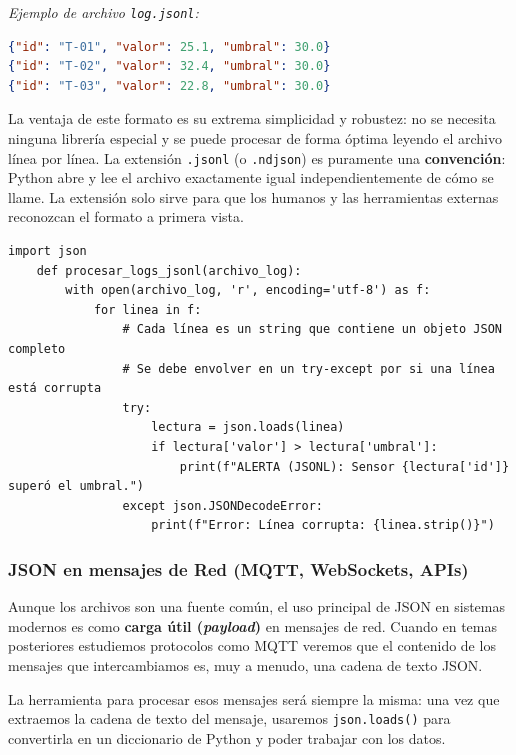 \begin{itemize}
    \textit{Ejemplo de archivo \texttt{log.jsonl}:}
    \begin{lstlisting}[language=json]
{"id": "T-01", "valor": 25.1, "umbral": 30.0}
{"id": "T-02", "valor": 32.4, "umbral": 30.0}
{"id": "T-03", "valor": 22.8, "umbral": 30.0}
    \end{lstlisting}

\newpage

    La ventaja de este formato es su extrema simplicidad y robustez: no se necesita ninguna librería especial y se puede procesar de forma óptima leyendo el archivo línea por línea. La extensión \texttt{.jsonl} (o \texttt{.ndjson}) es puramente una \textbf{convención}: Python abre y lee el archivo exactamente igual independientemente de cómo se llame. La extensión solo sirve para que los humanos y las herramientas externas reconozcan el formato a primera vista.
    
    \begin{lstlisting}[style=PythonStyle, caption={Procesando un archivo JSON Lines línea por línea.}]
    import json
    def procesar_logs_jsonl(archivo_log):
        with open(archivo_log, 'r', encoding='utf-8') as f:
            for linea in f:
                # Cada línea es un string que contiene un objeto JSON completo
                # Se debe envolver en un try-except por si una línea está corrupta
                try:
                    lectura = json.loads(linea)
                    if lectura['valor'] > lectura['umbral']:
                        print(f"ALERTA (JSONL): Sensor {lectura['id']} superó el umbral.")
                except json.JSONDecodeError:
                    print(f"Error: Línea corrupta: {linea.strip()}")
    \end{lstlisting}
\end{itemize}

\subsubsection*{JSON en mensajes de Red (MQTT, WebSockets, APIs)}
Aunque los archivos son una fuente común, el uso principal de JSON en sistemas modernos es como \textbf{carga útil (\textit{payload})} en mensajes de red. Cuando en temas posteriores estudiemos protocolos como MQTT veremos que el contenido de los mensajes que intercambiamos es, muy a menudo, una cadena de texto JSON.

La herramienta para procesar esos mensajes será siempre la misma: una vez que extraemos la cadena de texto del mensaje, usaremos \texttt{json.loads()} para convertirla en un diccionario de Python y poder trabajar con los datos.

